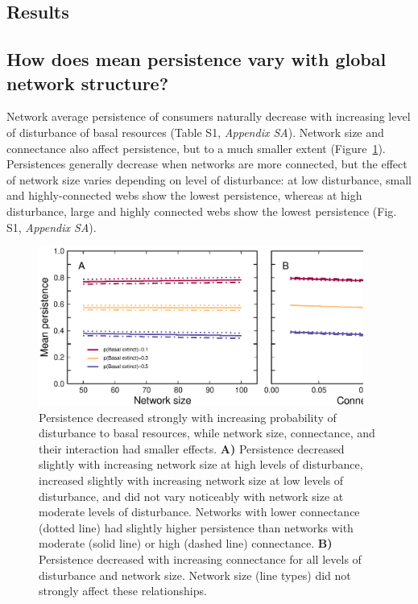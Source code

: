 \documentclass[12pt]{article}
\begin{document}
\begin{spacing}{2.0}
\section*{Results}

    \subsection*{How does mean persistence vary with global network structure?}
    
        Network average persistence of consumers naturally decrease with increasing level of disturbance of basal resources (Table S1, \emph{Appendix SA}). Network size and connectance also affect persistence, but to a much smaller extent (Figure~\ref{fig:lm_CS}). Persistences generally decrease when networks are more connected, but the effect of network size varies depending on level of disturbance: at low disturbance, small and highly-connected webs show the lowest persistence, whereas at high disturbance, large and highly connected webs show the lowest persistence (Fig. S1, \emph{Appendix SA}).

        \begin{figure}[h!]
            \centering
            \includegraphics[width=0.95\textwidth]{figures/persistence_vs_SC_lm.eps}
            \caption{Persistence decreased strongly with increasing probability of disturbance to basal resources, while network size, connectance, and their interaction had smaller effects. \textbf{A)} Persistence decreased slightly with increasing network size at high levels of disturbance, increased slightly with increasing network size at low levels of disturbance, and did not vary noticeably with network size at moderate levels of disturbance. Networks with lower connectance (dotted line) had slightly higher persistence than networks with moderate (solid line) or high (dashed line) connectance.
            \textbf{B)} Persistence decreased with increasing connectance for all levels of disturbance and network size. Network size (line types) did not strongly affect these relationships.}
            \label{fig:lm_CS}
        \end{figure}



\end{spacing}
\end{document}
